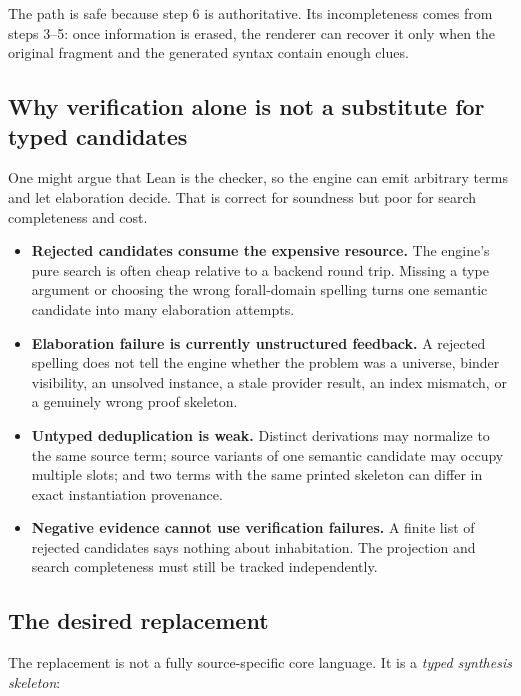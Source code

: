 \documentclass[11pt]{article}
\newcommand{\term}[1]{\emph{#1}}
\begin{document}
The path is safe because step 6 is authoritative.  Its incompleteness comes
from steps 3--5: once information is erased, the renderer can recover it only
when the original fragment and the generated syntax contain enough clues.

\subsection{Why verification alone is not a substitute for typed candidates}

One might argue that Lean is the checker, so the engine can emit arbitrary
terms and let elaboration decide.  That is correct for soundness but poor for
search completeness and cost.

\begin{itemize}
  \item \textbf{Rejected candidates consume the expensive resource.}
    The engine's pure search is often cheap relative to a backend round trip.
    Missing a type argument or choosing the wrong forall-domain spelling turns
    one semantic candidate into many elaboration attempts.

  \item \textbf{Elaboration failure is currently unstructured feedback.}
    A rejected spelling does not tell the engine whether the problem was a
    universe, binder visibility, an unsolved instance, a stale provider result,
    an index mismatch, or a genuinely wrong proof skeleton.

  \item \textbf{Untyped deduplication is weak.}
    Distinct derivations may normalize to the same source term; source variants
    of one semantic candidate may occupy multiple slots; and two terms with the
    same printed skeleton can differ in exact instantiation provenance.

  \item \textbf{Negative evidence cannot use verification failures.}
    A finite list of rejected candidates says nothing about inhabitation.  The
    projection and search completeness must still be tracked independently.
\end{itemize}

\subsection{The desired replacement}

The replacement is not a fully source-specific core language.  It is a
\term{typed synthesis skeleton}:
\end{document}
